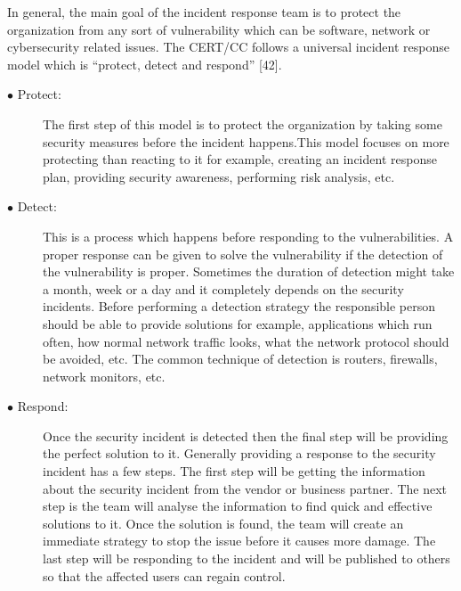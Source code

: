 In general, the main goal of the incident response team is to protect the organization from any sort of vulnerability which can be software, network or cybersecurity related issues. The CERT/CC follows a universal incident response model which is “protect, detect and respond” [42].
\begin{description}
	\item [$\bullet$ Protect:] The first step of this model is to protect the organization by taking some security measures before the incident happens.This model focuses on more protecting than reacting to it for example, creating an incident response plan, providing security awareness, performing risk analysis, etc.
	
	\item [$\bullet$ Detect:] This is a process which happens before responding to the vulnerabilities. A proper response can be given to solve the vulnerability if the detection of the vulnerability is proper. Sometimes the duration of detection might take a month, week or a day and it completely depends on the security incidents. Before performing a detection strategy the responsible person should be able to provide solutions for example, applications which run often, how normal network traffic looks, what the network protocol should be avoided, etc. The common technique of detection is routers, firewalls, network monitors, etc.
	
	\item [$\bullet$ Respond:] Once the security incident is detected then the final step will be providing the perfect solution to it. Generally providing a response to the security incident has a few steps. The first step will be getting the information about the security incident from the vendor or business partner. The next step is the team will analyse the information to find quick and effective solutions to it. Once the solution is found, the team will create an immediate strategy to stop the issue before it causes more damage. The last step will be responding to the incident and will be published to others so that the affected users can regain control.
\end{description}

